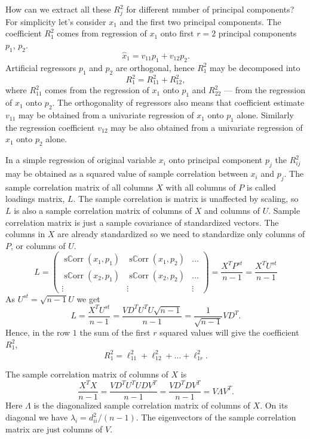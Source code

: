\documentclass[12pt]{article}
\DeclareMathOperator{\sCorr}{s\mathbb{C}orr}
\begin{document}
How can we extract all these $R^2_j$ for different number of principal components?
For simplicity let's consider $x_1$ and the first two principal components.
The coefficient $R^2_1$ comes from regression of $x_1$ onto first $r = 2$ principal components $p_1$, $p_2$.
\[
\hat x_1 = v_{11} p_1 + v_{12} p_2.
\]
Artificial regressors $p_1$ and $p_2$ are orthogonal, hence $R^2_1$ may be decomposed into 
\[
R^2_1 = R^2_{11} + R^2_{12},
\]
where $R^2_{11}$ comes from the regression of $x_1$ onto $p_1$ and $R^2_{22}$ — from the regression of $x_1$ onto $p_2$.
The orthogonality of regressors also means that coefficient estimate $v_{11}$ may be obtained from a univariate regression of $x_1$ onto $p_1$ alone. 
Similarly the regression coefficient $v_{12}$ may be also obtained from a univariate regression of $x_1$ onto $p_2$ alone. 

In a simple regression of original variable $x_i$ onto principal component $p_j$ the $R^2_{ij}$ may be obtained as a squared value of sample correlation between $x_i$ and $p_j$.
The sample correlation matrix of all columns $X$ with all columns of $P$ is called loadings matrix, $L$.
The sample correlation is matrix is unaffected by scaling, so $L$ is also a sample correlation matrix of columns of $X$ and columns of $U$.
Sample correlation matrix is just a sample covariance of standardized vectors.
The columns in $X$ are already standardized so we need to standardize only columns of $P$, or columns of $U$.
\[
L = \begin{pmatrix}
    \sCorr(x_1, p_1) & \sCorr(x_1, p_2) & \ldots \\
    \sCorr(x_2, p_1) & \sCorr(x_2, p_2) & \ldots \\
    \vdots & \vdots & \vdots 
\end{pmatrix} = 
\frac{X^T P^{st}}{n - 1} = \frac{X^T U^{st}}{n - 1}
\]
As $U^{st} = \sqrt{n-1} U$ we get
\[
L =  \frac{X^T U^{st}}{n - 1} = \frac{VD^T U^T U\sqrt{n-1}}{n-1} = \frac{1}{\sqrt{n-1}}V D^T.
\]
Hence, in the row $1$ the sum of the first $r$ squared values will give the coefficient $R^2_1$,
\[
R^2_1 = \ell_{11}^2 + \ell_{12}^2 + \dots + \ell_{1r}^2.
\]

The sample correlation matrix of columns of $X$ is
\[
\frac{X^T X}{n-1} = \frac{V D^T U^T UDV^T}{n - 1} = \frac{V D^T D V^T}{ n - 1} = V \Lambda V^T.
\]
Here $\Lambda$ is the diagonalized sample correlation matrix of columns of $X$.
On its diagonal we have $\lambda_i = d_{ii}^2 / (n - 1)$.
The eigenvectors of the sample correlation matrix are just columns of $V$. 
\end{document}
